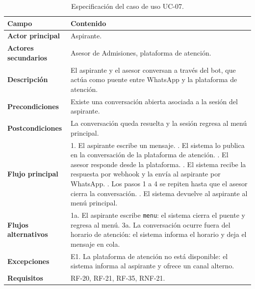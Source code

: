 \documentclass[12pt,a4paper]{report}
\newcommand{\tablacompacta}{\setstretch{1.1}\small}
\newcommand{\cabecera}[1]{\rowcolor{filacabecera}#1}
\begin{document}
\begin{table}[H]
    \centering
    \tablacompacta
    \begin{tabularx}{\textwidth}{p{3.2cm}X}
        \toprule
        \cabecera{\textbf{Campo}} & \textbf{Contenido} \\
        \midrule
        \textbf{Actor principal} & Aspirante. \\
        \textbf{Actores secundarios} & Asesor de Admisiones, plataforma de atención. \\
        \textbf{Descripción} & El aspirante y el asesor conversan a través del bot, que actúa como puente entre WhatsApp y la plataforma de atención. \\
        \textbf{Precondiciones} & Existe una conversación abierta asociada a la sesión del aspirante. \\
        \textbf{Postcondiciones} & La conversación queda resuelta y la sesión regresa al menú principal. \\
        \textbf{Flujo principal} &
        1. El aspirante escribe un mensaje. \newline
        2. El sistema lo publica en la conversación de la plataforma de atención. \newline
        3. El asesor responde desde la plataforma. \newline
        4. El sistema recibe la respuesta por webhook y la envía al aspirante por WhatsApp. \newline
        5. Los pasos 1 a 4 se repiten hasta que el asesor cierra la conversación. \newline
        6. El sistema devuelve al aspirante al menú principal. \\
        \textbf{Flujos alternativos} &
        1a. El aspirante escribe \texttt{menu}: el sistema cierra el puente y regresa al menú. \newline
        3a. La conversación ocurre fuera del horario de atención: el sistema informa el horario y deja el mensaje en cola. \\
        \textbf{Excepciones} & E1. La plataforma de atención no está disponible: el sistema informa al aspirante y ofrece un canal alterno. \\
        \textbf{Requisitos} & RF-20, RF-21, RF-35, RNF-21. \\
        \bottomrule
    \end{tabularx}
    \caption{Especificación del caso de uso UC-07.}
\end{table}
\end{document}

